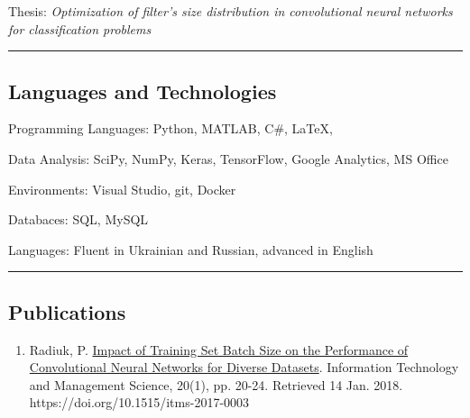 \documentclass[10pt,letterpaper]{article}
\newenvironment{indentsection}[1]%
{\begin{list}{}%
	{\setlength{\leftmargin}{#1}}%
	\item[]%
}
{\end{list}}
\begin{document}
\begin{itemize}

\end{itemize}

\hrule
\vspace{-0.4em}
\subsection*{Languages and Technologies}

\begin{indentsection}{\parindent}
\begin{description*}
	\item[Programming Languages:]
	Python, MATLAB, C\#, \LaTeX, 
	\item[Data Analysis:]
	SciPy, NumPy, Keras, TensorFlow, Google Analytics, MS Office
	\item[Environments:]
	Visual Studio, git, Docker
	\item[Databaces:]
	SQL, MySQL
	\item[Languages:]
	Fluent in Ukrainian and Russian, advanced in English
\end{description*}
\end{indentsection}

\hrule
\vspace{-0.4em}
\subsection*{Publications}

\begin{enumerate}
	\parskip=0.1em
	
	
	\item Radiuk, P. \href{https://www.degruyter.com/downloadpdf/j/itms.2017.20.issue-1/itms-2017-0003/itms-2017-0003.pdf}{Impact of Training Set Batch Size on the Performance of Convolutional Neural Networks for Diverse Datasets}. Information Technology and Management Science, 20(1), pp. 20-24. Retrieved 14 Jan. 2018. https://doi.org/10.1515/itms-2017-0003

\end{enumerate}
\end{document}
